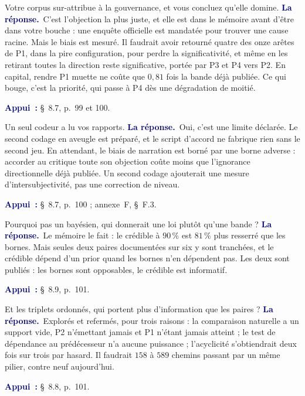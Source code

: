 \documentclass[11pt,a4paper]{article}
\newcommand{\rep}[1]{\smallskip\noindent\textcolor{navy}{\textbf{La réponse.}}\ #1\par}
\newcommand{\appui}[1]{\smallskip\noindent\small\textcolor{navy}{\textbf{Appui~:}} #1\par\normalsize}
\begin{document}
\begin{question}{\og Votre corpus sur-attribue à la gouvernance, et vous concluez qu'elle domine.\fg{}}
\rep{C'est l'objection la plus juste, et elle est dans le mémoire avant d'être dans votre bouche :
une enquête officielle est mandatée pour trouver une cause racine. Mais le biais est mesuré. Il
faudrait avoir retourné quatre des onze arêtes de P1, dans la pire configuration, pour perdre la
significativité, et même en les retirant toutes la direction reste significative, portée par P3
et P4 vers P2. En capital, rendre P1 muette ne coûte que $0{,}81$ fois la bande déjà publiée. Ce
qui bouge, c'est la priorité, qui passe à P4 dès une dégradation de moitié.}
\appui{\S~8.7, p.~99 et 100.}
\end{question}

\begin{question}{\og Un seul codeur a lu vos rapports.\fg{}}
\rep{Oui, c'est une limite déclarée. Le second codage en aveugle est préparé, et le script
d'accord ne fabrique rien sans le second jeu. En attendant, le biais de narration est borné par
une borne adverse : accorder au critique toute son objection coûte moins que l'ignorance
directionnelle déjà publiée. Un second codage ajouterait une mesure d'intersubjectivité, pas une
correction de niveau.}
\appui{\S~8.7, p.~100 ; annexe~F, \S~F.3.}
\end{question}

\begin{question}{\og Pourquoi pas un bayésien, qui donnerait une loi plutôt qu'une bande ?\fg{}}
\rep{Le mémoire le fait : le crédible à $90\,\%$ est $81\,\%$ plus resserré que les bornes. Mais
seules deux paires documentées sur six y sont tranchées, et le crédible dépend d'un prior quand les
bornes n'en dépendent pas. Les deux sont publiés : les bornes sont opposables, le crédible est
informatif.}
\appui{\S~8.9, p.~101.}
\end{question}

\begin{question}{\og Et les triplets ordonnés, qui portent plus d'information que les paires ?\fg{}}
\rep{Explorés et refermés, pour trois raisons : la comparaison naturelle a un support vide, P2
n'émettant jamais et P1 n'étant jamais atteint ; le test de dépendance au prédécesseur n'a aucune
puissance ; l'acyclicité s'obtiendrait deux fois sur trois par hasard. Il faudrait $158$ à $589$
chemins passant par un même pilier, contre neuf aujourd'hui.}
\appui{\S~8.8, p.~101.}
\end{question}
\end{document}
